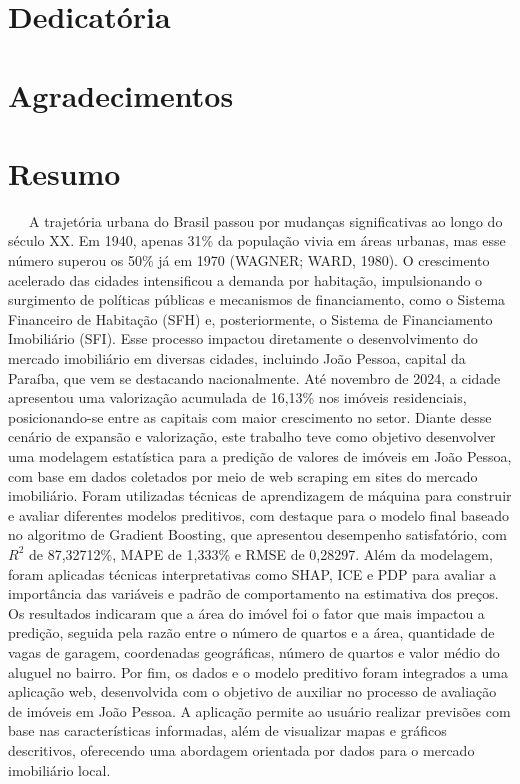 \documentclass[
  12pt,
  a4paper,
]{scrreprt}
\begin{document}
\chapter*{\centering Dedicatória}
\thispagestyle{empty}

\chapter*{\centering Agradecimentos}
\thispagestyle{empty}

\chapter*{\centering Resumo}
\thispagestyle{empty}

~~~A trajetória urbana do Brasil passou por mudanças significativas ao
longo do século XX. Em 1940, apenas 31\% da população vivia em áreas
urbanas, mas esse número superou os 50\% já em 1970 (WAGNER; WARD,
1980). O crescimento acelerado das cidades intensificou a demanda por
habitação, impulsionando o surgimento de políticas públicas e mecanismos
de financiamento, como o Sistema Financeiro de Habitação (SFH) e,
posteriormente, o Sistema de Financiamento Imobiliário (SFI). Esse
processo impactou diretamente o desenvolvimento do mercado imobiliário
em diversas cidades, incluindo João Pessoa, capital da Paraíba, que vem
se destacando nacionalmente. Até novembro de 2024, a cidade apresentou
uma valorização acumulada de 16,13\% nos imóveis residenciais,
posicionando-se entre as capitais com maior crescimento no setor. Diante
desse cenário de expansão e valorização, este trabalho teve como
objetivo desenvolver uma modelagem estatística para a predição de
valores de imóveis em João Pessoa, com base em dados coletados por meio
de web scraping em sites do mercado imobiliário. Foram utilizadas
técnicas de aprendizagem de máquina para construir e avaliar diferentes
modelos preditivos, com destaque para o modelo final baseado no
algoritmo de Gradient Boosting, que apresentou desempenho satisfatório,
com \(R^2\) de 87,32712\%, MAPE de 1,333\% e RMSE de 0,28297. Além da
modelagem, foram aplicadas técnicas interpretativas como SHAP, ICE e PDP
para avaliar a importância das variáveis e padrão de comportamento na
estimativa dos preços. Os resultados indicaram que a área do imóvel foi
o fator que mais impactou a predição, seguida pela razão entre o número
de quartos e a área, quantidade de vagas de garagem, coordenadas
geográficas, número de quartos e valor médio do aluguel no bairro. Por
fim, os dados e o modelo preditivo foram integrados a uma aplicação web,
desenvolvida com o objetivo de auxiliar no processo de avaliação de
imóveis em João Pessoa. A aplicação permite ao usuário realizar
previsões com base nas características informadas, além de visualizar
mapas e gráficos descritivos, oferecendo uma abordagem orientada por
dados para o mercado imobiliário local.
\end{document}
